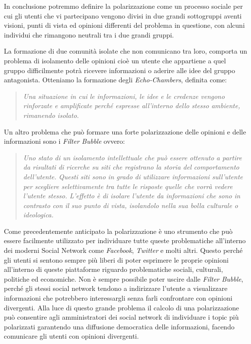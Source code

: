 In conclusione potremmo definire la polarizzazione come un processo sociale per cui gli utenti che vi partecipano vengono divisi in due grandi sottogruppi aventi visioni, punti di vista ed opinioni differenti del problema in questione, con alcuni individui che rimangono neutrali tra i due grandi gruppi.

La formazione di due comunità isolate che non comunicano tra loro, comporta un problema di isolamento delle opinioni
cioè un utente che appartiene a quel gruppo difficilmente potrà ricevere informazioni o aderire alle idee del gruppo antagonista.
Otteniamo  la formazione degli \textit{Echo-Chambers}, definita come:
\begin{quote} 
\textit{Una situazione in cui le informazioni, le idee e le credenze vengono rinforzate e amplificate perché espresse all'interno dello stesso ambiente, rimanendo isolato.}
\end{quote}

Un altro problema che può formare una forte polarizzazione delle opinioni e delle informazioni sono i \textit{Filter Bubble} ovvero:

\begin{quote} 
\textit{Uno stato di un isolamento intellettuale che può essere ottenuto a partire da risultati di ricerche su siti che registrano la storia del comportamento dell'utente. Questi siti sono in grado di utilizzare informazioni sull'utente per scegliere selettivamente tra tutte le risposte quelle che vorrà vedere l'utente stesso. L'effetto è di isolare l'utente da informazioni che sono in contrasto con il suo punto di vista, isolandolo nella sua bolla culturale o ideologica.}
\end{quote}

Come precedentemente anticipato la polarizzazione è uno strumento che può essere facilmente utilizzato per individuare tutte queste problematiche all'interno dei moderni Social Network come \textit{Facebook}, \textit{Twitter} e molti altri. Questo perché gli utenti si sentono sempre più liberi di poter esprimere le proprie opinioni all'interno di queste piattaforme riguardo problematiche sociali, culturali, politiche ed economiche.
Non è sempre possibile poter uscire dalle \textit{Filter Bubble}, perché gli stessi social network tendono a indirizzare l'utente a visualizzare informazioni che potrebbero interessargli senza farli confrontare con opinioni divergenti. 
Alla luce di questo grande problema il calcolo di una polarizzazione può consentire agli amministratori dei social network di individuare i topic più polarizzati garantendo una diffusione democratica delle informazioni, facendo comunicare gli utenti con opinioni divergenti.

